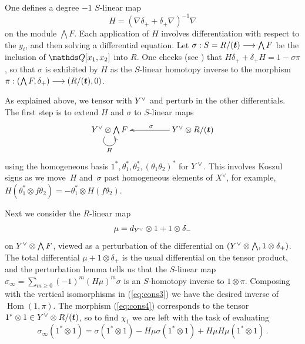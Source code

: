 \documentclass{compositio}
\theoremstyle{definition}
\numberwithin{equation}{section}
\def\Hom{\operatorname{Hom}}
\begin{document}
One defines a degree $-1$ $S$-linear map
\[
H = (\nabla \delta_+ + \delta_+ \nabla)^{-1} \nabla
\]
on the module $\bigwedge F$. Each application of $H$ involves differentiation with respect to the $y_i$, and then solving a differential equation. Let $\sigma: S = R/(\boldsymbol{t}) \longrightarrow \bigwedge F$ be the inclusion of $\QQ[x_1,x_2]$ into $R$. One checks (see \cite[Section 8.1]{dm1102.2957}) that $H \delta_+ + \delta_+ H = 1 - \sigma \pi$, so that $\sigma$ is exhibited by $H$ as the $S$-linear homotopy inverse to the morphism $\pi: (\bigwedge F, \delta_+) \longrightarrow (R/(\boldsymbol{t}),0)$.

As explained above, we tensor with $Y^{\vee}$ and perturb in the other differentials. The first step is to extend $H$ and $\sigma$ to $S$-linear maps
\[
\xymatrix@C+2pc{
Y\mdual \otimes \bigwedge F \ar@(dl,dr)[]_{H} & Y\mdual \otimes R/(\boldsymbol{t}) \ar[l]_{\sigma}
}
\]
using the homogeneous basis $1^*, \theta_1^*, \theta_2^*, (\theta_1\theta_2)^*$ for $Y^{\vee}$. This involves Koszul signs as we move~$H$ and~$\sigma$ past homogeneous elements of $X^{\lor}$, for example, $H(\theta_1^* \otimes f \theta_2) = - \theta_1^* \otimes H(f \theta_2)$. 

Next we consider the $R$-linear map
\[
\mu = d_{Y^{\vee}} \otimes 1 + 1 \otimes \delta_{-}
\]
on $Y^{\vee} \otimes \bigwedge F$, viewed as a perturbation of the differential on $(Y^{\vee} \otimes \bigwedge, 1 \otimes \delta_{+})$. The total differential $\mu + 1 \otimes \delta_{+}$ is the usual differential on the tensor product, and the perturbation lemma tells us that the $S$-linear map $\sigma_\infty = \sum_{m \ge 0} (-1)^m (H \mu)^m \sigma$ is an $S$-homotopy inverse to $1 \otimes \pi$. Composing with the vertical isomorphisms in (\ref{eq:cons3}) we have the desired inverse of $\Hom(1,\pi)$. The morphism (\ref{eq:cons4}) corresponds to the tensor $1^* \otimes 1 \in Y^{\vee} \otimes R/(\boldsymbol{t})$, so to find $\chi_1$ we are left with the task of evaluating
\[
\sigma_\infty(1^* \otimes 1) = \sigma(1^* \otimes 1) - H \mu \sigma(1^* \otimes 1) + H \mu H \mu(1^* \otimes 1) \, .
\]
\end{document}
